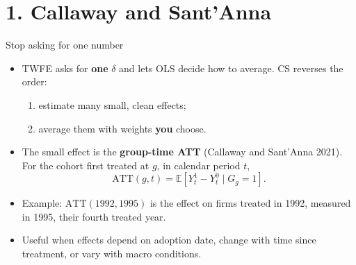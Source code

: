 \documentclass[
  11pt,
  ignorenonframetext,
  aspectratio=169,
]{beamer}
\providecommand{\tightlist}{%
  \setlength{\itemsep}{0pt}\setlength{\parskip}{0pt}}
\begin{document}
\section{1. Callaway and Sant'Anna}\label{callaway-and-santanna}

\begin{frame}{Stop asking for one number}
\protect{}\label{stop-asking-for-one-number}
\begin{itemize}
\tightlist
\item
  TWFE asks for \textbf{one} \(\delta\) and lets OLS decide how to
  average. CS reverses the order:

  \begin{enumerate}
  \tightlist
  \item
    estimate many small, clean effects;
  \item
    average them with weights \textbf{you} choose.
  \end{enumerate}
\item
  The small effect is the \textbf{group-time ATT} (Callaway and
  Sant'Anna 2021). For the cohort first treated at \(g\), in calendar
  period \(t\), \[
  \text{ATT}(g, t) = \mathbb{E}[Y^1_t - Y^0_t \mid G_g = 1].
  \]
\item
  Example: \(\text{ATT}(1992, 1995)\) is the effect on firms treated in
  1992, measured in 1995, their fourth treated year.
\item
  Useful when effects depend on adoption date, change with time since
  treatment, or vary with macro conditions.
\end{itemize}
\end{frame}
\end{document}
